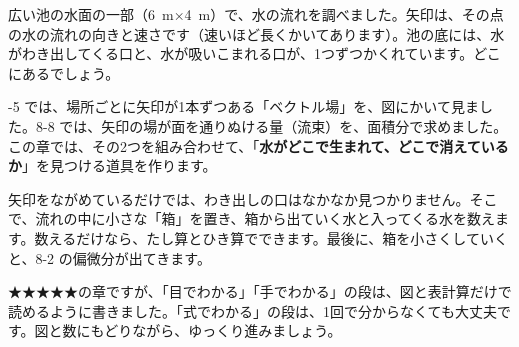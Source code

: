 \begin{hatena}
広い池の水面の一部（\qty{6}{m}×\qty{4}{m}）で、水の流れを調べました。矢印は、その点の水の流れの向きと速さです（速いほど長くかいてあります）。池の底には、水がわき出してくる口と、水が吸いこまれる口が、1つずつかくれています。どこにあるでしょう。
\begin{bkfigure}
\end{bkfigure}
\end{hatena}

-5 では、場所ごとに矢印が1本ずつある「ベクトル場」を、図にかいて見ました。8-8 では、矢印の場が面を通りぬける量（流束）を、面積分で求めました。この章では、その2つを組み合わせて、「\textbf{水がどこで生まれて、どこで消えているか}」を見つける道具を作ります。

矢印をながめているだけでは、わき出しの口はなかなか見つかりません。そこで、流れの中に小さな「箱」を置き、箱から出ていく水と入ってくる水を数えます。数えるだけなら、たし算とひき算でできます。最後に、箱を小さくしていくと、8-2 の偏微分が出てきます。

★★★★★の章ですが、「目でわかる」「手でわかる」の段は、図と表計算だけで読めるように書きました。「式でわかる」の段は、1回で分からなくても大丈夫です。図と数にもどりながら、ゆっくり進みましょう。

